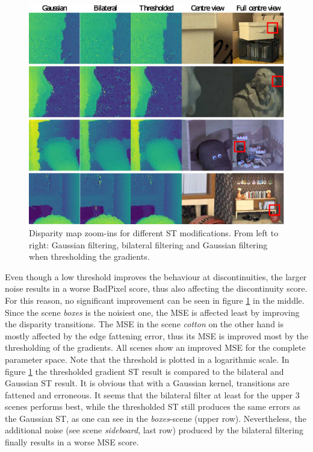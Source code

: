 \documentclass  [
  paper    = a4,
  BCOR     = 10mm,
  twoside,
  fontsize = 12pt,
  fleqn,
  toc      = bibnumbered,
  toc      = listofnumbered,
  numbers  = noendperiod,
  headings = normal,
  listof   = leveldown,
  version  = 3.03
]                                       {scrreprt}
\begin{document}
\begin{figure}[h!]
	\centering
	\includegraphics[width=0.7\linewidth]{images/thresh_results}
	\caption[Disparity map zoom-ins for different methods]{Disparity map zoom-ins for different ST modifications. From left to right: Gaussian filtering, bilateral filtering and Gaussian filtering when thresholding the gradients.}
	\label{fig:threshresults}
\end{figure}
Even though a low threshold improves the behaviour at discontinuities, the larger noise results in a worse BadPixel score, thus also affecting the discontinuity score. For this reason, no significant improvement can be seen in figure \ref{fig:threshresults} in the middle.
Since the scene \textit{boxes} is the noisiest one, the MSE is affected least by improving the disparity transitions. The MSE in the scene \textit{cotton} on the other hand is mostly affected by the edge fattening error, thus its MSE is improved most by the thresholding of the gradients. All scenes show an improved MSE for the complete parameter space. Note that the threshold is plotted in a logarithmic scale. In figure \ref{fig:threshresults} the thresholded gradient ST result is compared to the bilateral and Gaussian ST result. It is obvious that with a Gaussian kernel, transitions are fattened and erroneous. It seems that the bilateral filter at least for the upper 3 scenes performs best, while the thresholded ST still produces the same errors as the Gaussian ST, as one can see in the \textit{boxes}-scene (upper row). Nevertheless, the additional noise (see scene \textit{sideboard}, last row) produced by the bilateral filtering finally results in a worse MSE score. 
\end{document}

